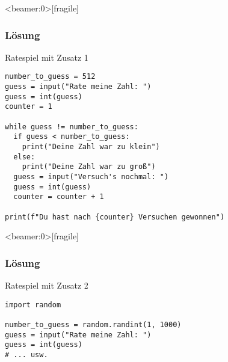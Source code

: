 \begin{frame}<beamer:0>[fragile]
\frametitle{Lösung}
\begin{solutionblock}{Ratespiel mit Zusatz 1}
\begin{verbatim}
number_to_guess = 512
guess = input("Rate meine Zahl: ")
guess = int(guess)
counter = 1

while guess != number_to_guess:
  if guess < number_to_guess:
    print("Deine Zahl war zu klein")
  else:
    print("Deine Zahl war zu groß")
  guess = input("Versuch's nochmal: ")
  guess = int(guess)
  counter = counter + 1
  
print(f"Du hast nach {counter} Versuchen gewonnen")	
\end{verbatim}
\end{solutionblock}
\end{frame}






\begin{frame}<beamer:0>[fragile]
\frametitle{Lösung}
\begin{solutionblock}{Ratespiel mit Zusatz 2}
\begin{verbatim}
import random 

number_to_guess = random.randint(1, 1000)
guess = input("Rate meine Zahl: ")
guess = int(guess)
# ... usw. 
\end{verbatim}
\end{solutionblock}
\end{frame}






